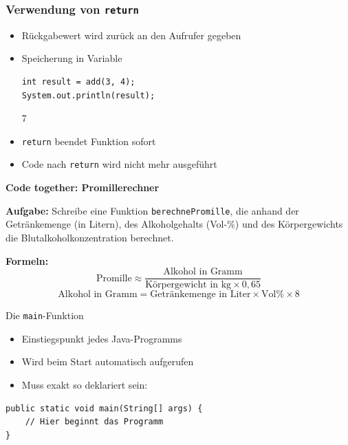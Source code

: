 \documentclass{../../presentation}
\begin{document}
\begin{frame}[fragile]
	\frametitle{Verwendung von \texttt{return}}

	\begin{itemize}
		\item\pause Rückgabewert wird zurück an den Aufrufer gegeben
		\item\pause Speicherung in Variable
		      \begin{verbatim}
int result = add(3, 4);
System.out.println(result); 
		\end{verbatim}
		      \begin{ausgabe}
			      7
		      \end{ausgabe}
		\item\pause \texttt{return} beendet Funktion sofort
		\item\pause Code nach \texttt{return} wird nicht mehr ausgeführt
	\end{itemize}
\end{frame}


\begin{frame}[plain]
	\centering
	{\Huge\bfseries Code together: Promillerechner}

	\vspace{1em}

	\begin{flushleft}
		\textbf{Aufgabe:} Schreibe eine Funktion \texttt{berechnePromille}, die anhand der Getränkemenge (in Litern),
		des Alkoholgehalts (Vol-\%) und des Körpergewichts die Blutalkoholkonzentration berechnet.

		\vspace{1em}

		\textbf{Formeln:}
		\[
			\text{Promille} \approx \frac{\text{Alkohol in Gramm}}{\text{Körpergewicht in kg} \times 0{,}65}
		\]
		\[
			\text{Alkohol in Gramm} = \text{Getränkemenge in Liter} \times \text{Vol\%} \times 8
		\]
	\end{flushleft}
\end{frame}




\begin{frame}[fragile]{Die \texttt{main}-Funktion}
	\begin{itemize}
		\item\pause Einstiegspunkt jedes Java-Programms
		\item\pause Wird beim Start automatisch aufgerufen
		\item\pause Muss exakt so deklariert sein:
	\end{itemize}

	\vspace{0.5em}

	\begin{verbatim}
public static void main(String[] args) {
    // Hier beginnt das Programm
}
\end{verbatim}
\end{frame}
\end{document}
